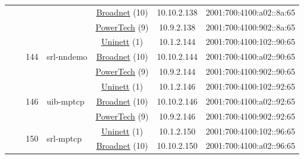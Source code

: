 \begin{small}
\begin{center}
\begin{longtable}{|c|c|c|c|c|c|c|c|}
  &  &  &  & \multicolumn{2}{|c|}{\tiny{\href{https://www.broadnet.no}{Broadnet} (10)}} & \tiny{10.10.2.138} & \tiny{2001:700:4100:a02::8a:65} \\* \cline{5-5}\cline{6-6}\cline{7-7}\cline{8-8}
  &  &  &  & \multicolumn{2}{|c|}{\tiny{\href{http://www.powertech.no}{PowerTech} (9)}} & \tiny{10.9.2.138} & \tiny{2001:700:4100:902::8a:65} \\* \cline{3-3}\cline{4-4}\cline{5-5}\cline{6-6}\cline{7-7}\cline{8-8}
  &  & \multirow{3}{*}{\tiny{144}} & \multicolumn{1}{|l|}{\multirow{3}{*}{\tiny{srl-nndemo}}} & \multicolumn{2}{|c|}{\tiny{\href{https://www.uninett.no}{Uninett} (1)}} & \tiny{10.1.2.144} & \tiny{2001:700:4100:102::90:65} \\* \cline{5-5}\cline{6-6}\cline{7-7}\cline{8-8}
  &  &  &  & \multicolumn{2}{|c|}{\tiny{\href{https://www.broadnet.no}{Broadnet} (10)}} & \tiny{10.10.2.144} & \tiny{2001:700:4100:a02::90:65} \\* \cline{5-5}\cline{6-6}\cline{7-7}\cline{8-8}
  &  &  &  & \multicolumn{2}{|c|}{\tiny{\href{http://www.powertech.no}{PowerTech} (9)}} & \tiny{10.9.2.144} & \tiny{2001:700:4100:902::90:65} \\* \cline{3-3}\cline{4-4}\cline{5-5}\cline{6-6}\cline{7-7}\cline{8-8}
  &  & \multirow{3}{*}{\tiny{146}} & \multicolumn{1}{|l|}{\multirow{3}{*}{\tiny{uib-mptcp}}} & \multicolumn{2}{|c|}{\tiny{\href{https://www.uninett.no}{Uninett} (1)}} & \tiny{10.1.2.146} & \tiny{2001:700:4100:102::92:65} \\* \cline{5-5}\cline{6-6}\cline{7-7}\cline{8-8}
  &  &  &  & \multicolumn{2}{|c|}{\tiny{\href{https://www.broadnet.no}{Broadnet} (10)}} & \tiny{10.10.2.146} & \tiny{2001:700:4100:a02::92:65} \\* \cline{5-5}\cline{6-6}\cline{7-7}\cline{8-8}
  &  &  &  & \multicolumn{2}{|c|}{\tiny{\href{http://www.powertech.no}{PowerTech} (9)}} & \tiny{10.9.2.146} & \tiny{2001:700:4100:902::92:65} \\* \cline{3-3}\cline{4-4}\cline{5-5}\cline{6-6}\cline{7-7}\cline{8-8}
  &  & \multirow{3}{*}{\tiny{150}} & \multicolumn{1}{|l|}{\multirow{3}{*}{\tiny{srl-mptcp}}} & \multicolumn{2}{|c|}{\tiny{\href{https://www.uninett.no}{Uninett} (1)}} & \tiny{10.1.2.150} & \tiny{2001:700:4100:102::96:65} \\* \cline{5-5}\cline{6-6}\cline{7-7}\cline{8-8}
  &  &  &  & \multicolumn{2}{|c|}{\tiny{\href{https://www.broadnet.no}{Broadnet} (10)}} & \tiny{10.10.2.150} & \tiny{2001:700:4100:a02::96:65} \\* \cline{5-5}\cline{6-6}\cline{7-7}\cline{8-8}

\end{longtable}
\end{center}
\end{small}
